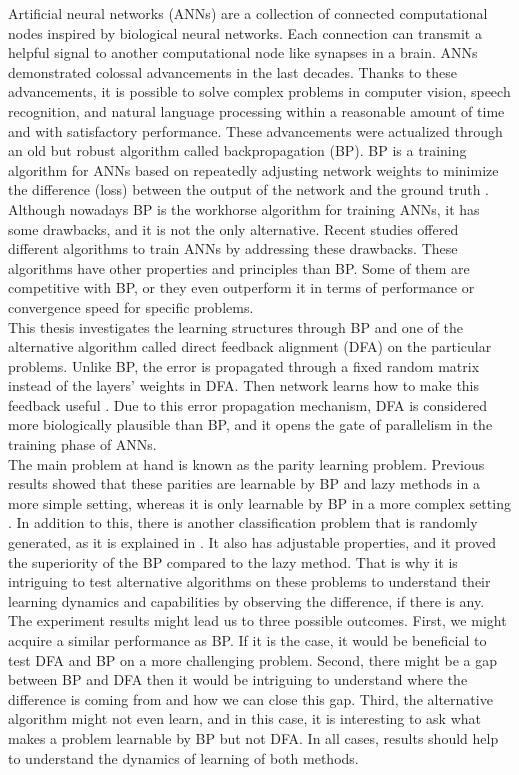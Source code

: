 \documentclass[a4paper, nobind]{templates/ociamthesis}
\begin{document}
Artificial neural networks (ANNs) are a collection of connected computational nodes inspired by biological neural networks. Each connection can transmit a helpful signal to another computational node like synapses in a brain. ANNs demonstrated colossal advancements in the last decades. Thanks to these advancements, it is possible to solve complex problems in computer vision, speech recognition, and natural language processing within a reasonable amount of time and with satisfactory performance. These advancements were actualized through an old but robust algorithm called backpropagation (BP). BP is a training algorithm for ANNs based on repeatedly adjusting network weights to minimize the difference (loss) between the output of the network and the ground truth \cite{Rumelhart:1986we}.\\
Although nowadays BP is the workhorse algorithm for training ANNs, it has some drawbacks, and it is not the only alternative. Recent studies offered different algorithms to train ANNs by addressing these drawbacks. These algorithms have other properties and principles than BP. Some of them are competitive with BP, or they even outperform it in terms of performance or convergence speed for specific problems.\\
This thesis investigates the learning structures through BP and one of the alternative algorithm called direct feedback alignment (DFA) on the particular problems. Unlike BP, the error is propagated through a fixed random matrix instead of the layers' weights in DFA. Then network learns how to make this feedback useful \cite{nøkland2016direct}. Due to this error propagation mechanism, DFA is considered more biologically plausible than BP, and it opens the gate of parallelism in the training phase of ANNs.\\
The main problem at hand is known as the parity learning problem. Previous results showed that these parities are learnable by BP and lazy methods in a more simple setting, whereas it is only learnable by BP in a more complex setting \cite{DBLP:journals/corr/abs-2002-07400}. In addition to this, there is another classification problem that is randomly generated, as it is explained in \cite{chizat2020implicit}. It also has adjustable properties, and it proved the superiority of the BP compared to the lazy method. That is why it is intriguing to test alternative algorithms on these problems to understand their learning dynamics and capabilities by observing the difference, if there is any.\\
The experiment results might lead us to three possible outcomes. First, we might acquire a similar performance as BP. If it is the case, it would be beneficial to test DFA and BP on a more challenging problem. Second, there might be a gap between BP and DFA then it would be intriguing to understand where the difference is coming from and how we can close this gap. Third, the alternative algorithm might not even learn, and in this case, it is interesting to ask what makes a problem learnable by BP but not DFA. In all cases, results should help to understand the dynamics of learning of both methods.\\
\end{document}

